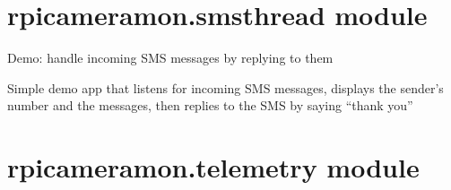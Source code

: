 \documentclass[letterpaper,10pt,english]{sphinxmanual}
\begin{document}
\chapter{rpicameramon.smsthread module}
\label{rpicameramon:rpicameramon-smsthread-module}\label{rpicameramon:module-rpicameramon.smsthread}
Demo: handle incoming SMS messages by replying to them

Simple demo app that listens for incoming SMS messages, displays the sender's number
and the messages, then replies to the SMS by saying ``thank you''

\begin{fulllineitems}
\label{rpicameramon:rpicameramon.smsthread.handle_sms}
\end{fulllineitems}


\begin{fulllineitems}
\label{rpicameramon:rpicameramon.smsthread.main}
\end{fulllineitems}



\chapter{rpicameramon.telemetry module}
\label{rpicameramon:rpicameramon-telemetry-module}\label{rpicameramon:module-rpicameramon.telemetry}
\end{document}
